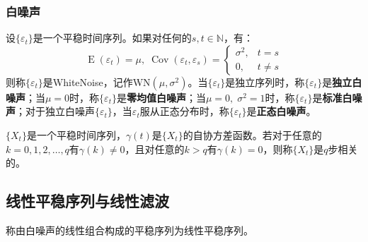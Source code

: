 \subsubsection{白噪声}
\begin{definition}
	设$\{\varepsilon_t\}$是一个平稳时间序列。如果对任何的$s,t\in\mathbb{N}$，有：
	\begin{equation*}
		\operatorname{E}(\varepsilon_t)=\mu,\;
		\operatorname{Cov}(\varepsilon_t,\varepsilon_s)=
		\begin{cases}
			\sigma^2, & t=s \\
			0, & t\ne s
		\end{cases}
	\end{equation*}
	则称$\{\varepsilon_t\}$是\gls{WhiteNoise}，记作WN$(\mu,\sigma^2)$。当$\{\varepsilon_t\}$是独立序列时，称$\{\varepsilon_t\}$是\textbf{独立白噪声}；当$\mu=0$时，称$\{\varepsilon_t\}$是\textbf{零均值白噪声}；当$\mu=0,\;\sigma^2=1$时，称$\{\varepsilon_t\}$是\textbf{标准白噪声}；对于独立白噪声$\{\varepsilon_t\}$，当$\varepsilon_t$服从正态分布时，称$\{\varepsilon_t\}$是\textbf{正态白噪声}。
\end{definition}

\begin{definition}
	$\{X_t\}$是一个平稳时间序列，$\gamma(t)$是$\{X_t\}$的自协方差函数。若对于任意的$k=0,1,2,\dots,q$有$\gamma(k)\ne0$，且对任意的$k>q$有$\gamma(k)=0$，则称$\{X_t\}$是$q$步相关的。
\end{definition}

\subsection{线性平稳序列与线性滤波}
\begin{definition}
	称由白噪声的线性组合构成的平稳序列为线性平稳序列。
\end{definition}
